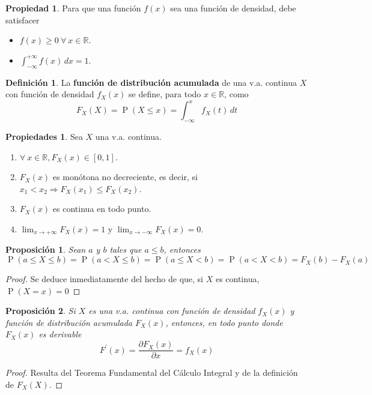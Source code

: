\documentclass[11pt]{article}
\theoremstyle{plain}
\newtheorem*{pro}{Proposición}
\theoremstyle{definition}
\newtheorem*{defi}{Definición}
\newtheorem*{prop}{Propiedad}
\newtheorem*{props}{Propiedades}
\theoremstyle{remark}
\newcommand{\deft}[1]{\textbf{#1}}  %
\newcommand{\proba}{\ensuremath{\operatorname{P}}}  %
\newcommand{\foralle}{\ensuremath{\forall \ }}  %
\begin{document}
    \begin{prop}
      Para que una función $f(x)$ sea una función de densidad, debe satisfacer
      \begin{itemize}
        \item $f(x) \geq 0 \ \foralle x \in \mathbb{R}$.
        \item $\int_{- \infty}^{+ \infty} f(x) \,dx = 1$.
      \end{itemize}
    \end{prop}

    \begin{defi}
      La \deft{función de distribución acumulada} de una v.a. continua $X$ con función de densidad $f_X(x)$ se define, para todo $x \in \mathbb{R}$, como
      \[ F_X(X) = \proba(X \leq x) = \int_{- \infty}^x f_X(t) \,dt \]
    \end{defi}

    \begin{props} Sea $X$ una v.a. continua.
      \begin{enumerate}
        \item $\foralle x \in \mathbb{R}, F_X(x) \in [0,1]$.
        \item $F_X(x)$ es monótona no decreciente, es decir, si $x_1 < x_2 \Rightarrow F_X(x_1) \leq F_X(x_2)$.
        \item $F_X(x)$ es continua en todo punto.
        \item $\lim_{x \to +\infty} F_X(x) = 1$ y $\lim_{x \to -\infty} F_X(x) = 0$.
      \end{enumerate}
    \end{props}

    \begin{pro}
      Sean $a$ y $b$ tales que $a \leq b$, entonces
      \[ \proba(a \leq X \leq b) = \proba(a < X \leq b) = \proba(a \leq X < b) = \proba(a < X < b) = F_X(b) - F_X(a) \]
    \end{pro}
    \begin{proof}
      Se deduce inmediatamente del hecho de que, si $X$ es continua, $\proba(X = x) = 0$
    \end{proof}

    \begin{pro}
      Si $X$ es una v.a. continua con función de densidad $f_X(x)$ y función de distribución acumulada $F_X(x)$, entonces, en todo punto donde $F_X(x)$ es derivable
      \[ F^\prime(x) = \frac{\partial F_X(x)}{\partial x} = f_X(x) \]
    \end{pro}
    \begin{proof}
      Resulta del Teorema Fundamental del Cálculo Integral y de la definición de $F_X(X)$.
    \end{proof}
\end{document}
